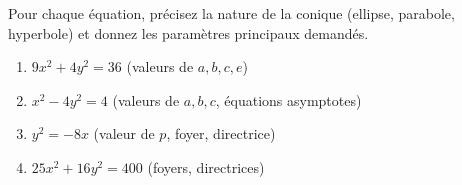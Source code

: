 \documentclass[11pt]{article}
\begin{document}
\begin{exercice}
Pour chaque équation, précisez la nature de la conique (ellipse, parabole, hyperbole) et donnez les paramètres principaux demandés.
\begin{enumerate}
    \item $9x^2 + 4y^2 = 36$ \quad (valeurs de $a, b, c, e$)
    \item $x^2 - 4y^2 = 4$ \quad (valeurs de $a, b, c$, équations asymptotes)
    \item $y^2 = -8x$ \quad (valeur de $p$, foyer, directrice)
    \item $25x^2 + 16y^2 = 400$ \quad (foyers, directrices)
\end{enumerate}
\end{exercice}
\end{document}
